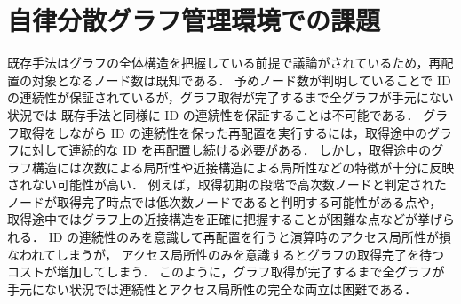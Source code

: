 \section{自律分散グラフ管理環境での課題}
既存手法はグラフの全体構造を把握している前提で議論がされているため，再配置の対象となるノード数は既知である．
予めノード数が判明していることで ID の連続性が保証されているが，グラフ取得が完了するまで全グラフが手元にない状況では
既存手法と同様に ID の連続性を保証することは不可能である．
グラフ取得をしながら ID の連続性を保った再配置を実行するには，取得途中のグラフに対して連続的な ID を再配置し続ける必要がある．
しかし，取得途中のグラフ構造には次数による局所性や近接構造による局所性などの特徴が十分に反映されない可能性が高い．
例えば，取得初期の段階で高次数ノードと判定されたノードが取得完了時点では低次数ノードであると判明する可能性がある点や，
取得途中ではグラフ上の近接構造を正確に把握することが困難な点などが挙げられる．
ID の連続性のみを意識して再配置を行うと演算時のアクセス局所性が損なわれてしまうが，
アクセス局所性のみを意識するとグラフの取得完了を待つコストが増加してしまう．
このように，グラフ取得が完了するまで全グラフが手元にない状況では連続性とアクセス局所性の完全な両立は困難である．
